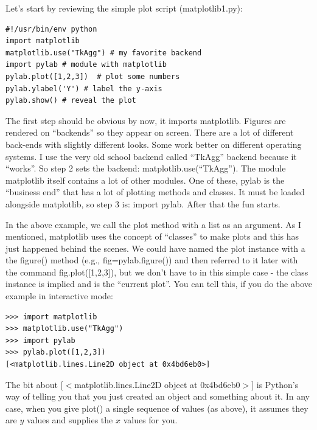 \documentclass[11pt]{book}
\begin{document}
{Let's start by reviewing the   simple plot script ({\color{blue}matplotlib1.py}):


{ \color{blue} \begin{verbatim}
#!/usr/bin/env python
import matplotlib
matplotlib.use("TkAgg") # my favorite backend
import pylab # module with matplotlib
pylab.plot([1,2,3])  # plot some numbers
pylab.ylabel('Y') # label the y-axis
pylab.show() # reveal the plot
\end{verbatim}}



The first step should be obvious by now, it imports {\color{blue}matplotlib}.
Figures are rendered on ``backends'' so they appear on screen.  There are a lot of different back-ends with slightly different looks.  Some work better on different operating systems.  I use the very old school backend called  ``TkAgg'' backend because it ``works''.  So step 2  sets the backend: {\color{blue}matplotlib.use(``TkAgg'')}.  The module {\color{blue}matplotlib} itself contains a lot of other modules.  One of these, 
{\color{blue}pylab} is the ``business end'' that has a lot of plotting methods and classes.  It must be  loaded alongside {\color{blue}matplotlib},   so step 3 is:  {\color{blue}import pylab}. After that the fun starts.  

In the above example, we call the {\color{blue}plot} method with a list as an argument.  As I mentioned, {\color{blue}matplotlib} uses the concept of ``classes'' to make plots and this has just happened behind the scenes. We could have named the plot instance with a the {\color{blue}figure()} method (e.g.,  {\color{blue}fig=pylab.figure()}) and then referred to it later with the command  {\color{blue}fig.plot([1,2,3])}, but we don't have to in this simple case - the class instance is implied and is the ``current plot''.  You can tell this, if you do the above example in interactive mode:

{ \color{blue}\begin{verbatim}
>>> import matplotlib
>>> matplotlib.use("TkAgg")
>>> import pylab
>>> pylab.plot([1,2,3])
[<matplotlib.lines.Line2D object at 0x4bd6eb0>]
\end{verbatim}}
\noindent The bit about {\color{blue}[$<$matplotlib.lines.Line2D object at 0x4bd6eb0$>$]} is Python's way of telling you that you just created an object and something about it.   
In any case, when you give {\color{blue} plot()} a single sequence of values (as above), it assumes they are $y$ values and supplies the $x$ values for you.  

}
\end{document}
